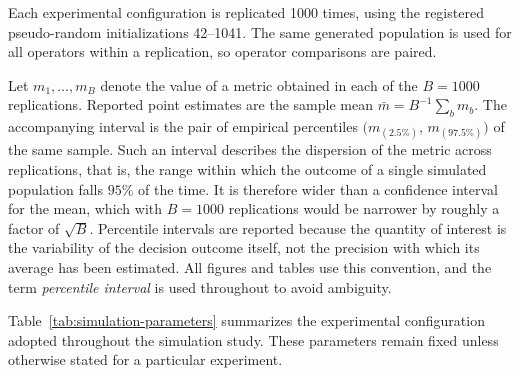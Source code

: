 \documentclass[mathematics,article,submit,moreauthors]{Definitions/mdpi}
\begin{document}
{\color{blue}Each experimental configuration is replicated 1000 times,
using the registered pseudo-random initializations 42--1041. The same
generated population is used for all operators within a replication, so
operator comparisons are paired.}

{\color{teal}Let $m_1,\dots,m_B$ denote the value of a metric obtained in
each of the $B=1000$ replications. Reported point estimates are the sample
mean $\bar{m}=B^{-1}\sum_b m_b$. The accompanying interval is the pair of
empirical percentiles $\bigl(m_{(2.5\%)},\,m_{(97.5\%)}\bigr)$ of the same
sample. Such an interval describes the dispersion of the metric across
replications, that is, the range within which the outcome of a single
simulated population falls $95\%$ of the time. It is therefore wider than a
confidence interval for the mean, which with $B=1000$ replications would be
narrower by roughly a factor of $\sqrt{B}$. Percentile intervals are
reported because the quantity of interest is the variability of the
decision outcome itself, not the precision with which its average has been
estimated. All figures and tables use this convention, and the term
\emph{percentile interval} is used throughout to avoid ambiguity.}

Table~\ref{tab:simulation-parameters} summarizes the experimental
configuration adopted throughout the simulation study. These parameters
remain fixed unless otherwise stated for a particular experiment.
\end{document}
